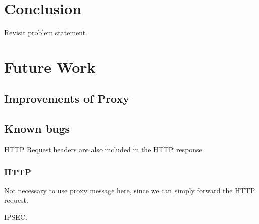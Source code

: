 \documentclass[USenglish]{ifimaster}
\begin{document}
\section{Conclusion}
Revisit problem statement.

\section{Future Work}

\subsection{Improvements of Proxy}

\subsection{Known bugs}

HTTP Request headers are also included in the HTTP response.

\subsubsection{HTTP}

Not necessary to use proxy message here, since we can simply forward the HTTP request.

IPSEC.

\pagebreak
\printbibliography{}
\printglossaries{}


\end{document}
